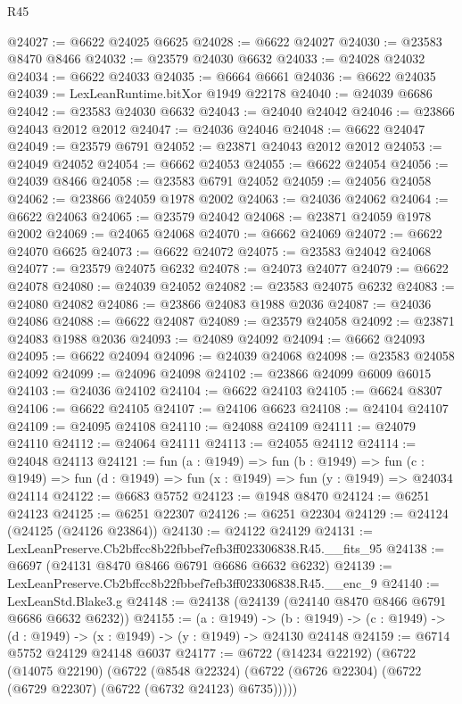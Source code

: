 \begin{lexlean}{R45}
\begin{coremodule}
{@24027 := @6622 @24025 @6625
@24028 := @6622 @24027
@24030 := @23583 @8470 @8466
@24032 := @23579 @24030 @6632
@24033 := @24028 @24032
@24034 := @6622 @24033
@24035 := @6664 @6661
@24036 := @6622 @24035
@24039 := LexLeanRuntime.bitXor @1949 @22178
@24040 := @24039 @6686
@24042 := @23583 @24030 @6632
@24043 := @24040 @24042
@24046 := @23866 @24043 @2012 @2012
@24047 := @24036 @24046
@24048 := @6622 @24047
@24049 := @23579 @6791
@24052 := @23871 @24043 @2012 @2012
@24053 := @24049 @24052
@24054 := @6662 @24053
@24055 := @6622 @24054
@24056 := @24039 @8466
@24058 := @23583 @6791 @24052
@24059 := @24056 @24058
@24062 := @23866 @24059 @1978 @2002
@24063 := @24036 @24062
@24064 := @6622 @24063
@24065 := @23579 @24042
@24068 := @23871 @24059 @1978 @2002
@24069 := @24065 @24068
@24070 := @6662 @24069
@24072 := @6622 @24070 @6625
@24073 := @6622 @24072
@24075 := @23583 @24042 @24068
@24077 := @23579 @24075 @6232
@24078 := @24073 @24077
@24079 := @6622 @24078
@24080 := @24039 @24052
@24082 := @23583 @24075 @6232
@24083 := @24080 @24082
@24086 := @23866 @24083 @1988 @2036
@24087 := @24036 @24086
@24088 := @6622 @24087
@24089 := @23579 @24058
@24092 := @23871 @24083 @1988 @2036
@24093 := @24089 @24092
@24094 := @6662 @24093
@24095 := @6622 @24094
@24096 := @24039 @24068
@24098 := @23583 @24058 @24092
@24099 := @24096 @24098
@24102 := @23866 @24099 @6009 @6015
@24103 := @24036 @24102
@24104 := @6622 @24103
@24105 := @6624 @8307
@24106 := @6622 @24105
@24107 := @24106 @6623
@24108 := @24104 @24107
@24109 := @24095 @24108
@24110 := @24088 @24109
@24111 := @24079 @24110
@24112 := @24064 @24111
@24113 := @24055 @24112
@24114 := @24048 @24113
@24121 := fun (a : @1949) =>
  fun (b : @1949) =>
  fun (c : @1949) => fun (d : @1949) => fun (x : @1949) => fun (y : @1949) => @24034 @24114
@24122 := @6683 @5752
@24123 := @1948 @8470
@24124 := @6251 @24123
@24125 := @6251 @22307
@24126 := @6251 @22304
@24129 := @24124 (@24125 (@24126 @23864))
@24130 := @24122 @24129
@24131 := LexLeanPreserve.Cb2bffcc8b22fbbef7efb3ff023306838.R45.__fits_95
@24138 := @6697 (@24131 @8470 @8466 @6791 @6686 @6632 @6232)
@24139 := LexLeanPreserve.Cb2bffcc8b22fbbef7efb3ff023306838.R45.__enc_9
@24140 := LexLeanStd.Blake3.g
@24148 := @24138 (@24139 (@24140 @8470 @8466 @6791 @6686 @6632 @6232))
@24155 := (a : @1949) ->
  (b : @1949) -> (c : @1949) -> (d : @1949) -> (x : @1949) -> (y : @1949) -> @24130 @24148
@24159 := @6714 @5752 @24129 @24148 @6037
@24177 := @6722
    (@14234 @22192)
    (@6722
      (@14075 @22190)
      (@6722
        (@8548 @22324)
        (@6722 (@6726 @22304) (@6722 (@6729 @22307) (@6722 (@6732 @24123) @6735)))))
}
\end{coremodule}
\end{lexlean}
